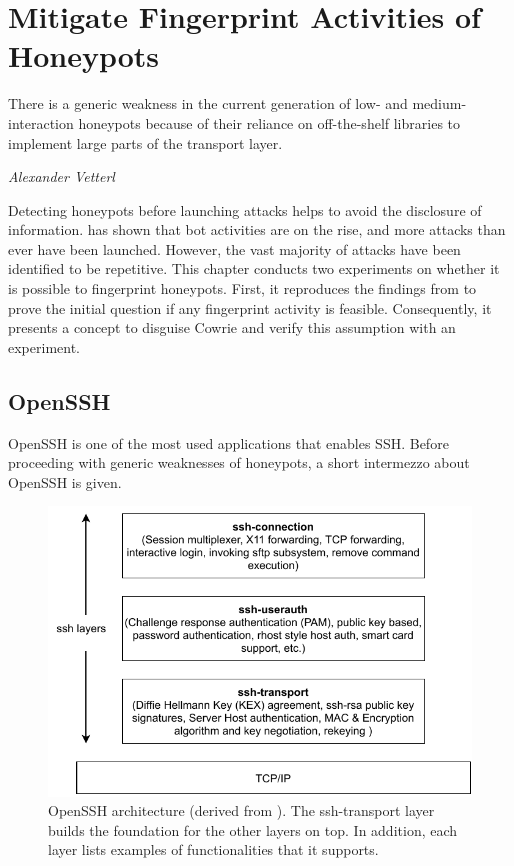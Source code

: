 \chapter{Mitigate Fingerprint Activities of Honeypots}
\label{chap:fingerprinting}

\epigraph{There is a generic weakness in the current generation of low- and medium-interaction honeypots because of their reliance on off-the-shelf libraries to implement large parts of the transport layer.}{\textit{Alexander Vetterl}}

Detecting honeypots before launching attacks helps to avoid the disclosure of information.
 has shown that bot activities are on the rise, and more attacks than ever have been launched.
However, the vast majority of attacks have been identified to be repetitive.
This chapter conducts two experiments on whether it is possible to fingerprint honeypots.
First, it reproduces the findings from \citet{vetterl2020} to prove the initial question if any fingerprint activity is feasible.
Consequently, it presents a concept to disguise Cowrie and verify this assumption with an experiment.

\section{OpenSSH}
\label{sec:openssh}

OpenSSH is one of the most used applications that enables SSH.
Before proceeding with generic weaknesses of honeypots, a short intermezzo about OpenSSH is given.

\begin{figure}[htbp]
    \centering
    \includegraphics{figures/openssh-architecture.pdf}
    \caption[OpenSSH architecture]{
        OpenSSH architecture (derived from \cite{openssh2007}).
        The ssh-transport layer builds the foundation for the other layers on top.
        In addition, each layer lists examples of functionalities that it supports. 
    }
    \label{fig:openssh-architecture}
\end{figure}

